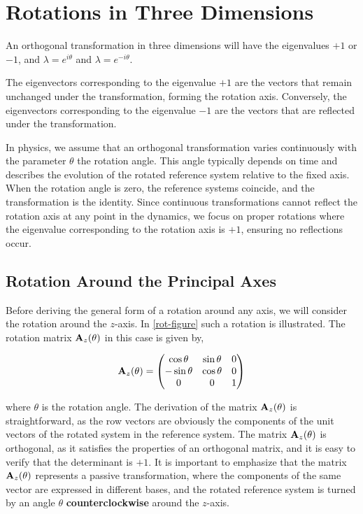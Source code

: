 \documentclass[12pt]{article}
\begin{document}
\section{Rotations in Three Dimensions}

An orthogonal transformation in three dimensions will have the eigenvalues $+1$ or $-1$, and
$\lambda = e^{i\theta}$ and $\lambda = e^{-i\theta}$.

The eigenvectors corresponding to the eigenvalue $+1$ are the vectors that remain unchanged
under the transformation, forming the rotation axis. Conversely, the eigenvectors
corresponding to the eigenvalue $-1$ are the vectors that are reflected under the
transformation.

In physics, we assume that an orthogonal transformation varies continuously with the
parameter $\theta$ the rotation angle. This angle typically depends on time and describes the
evolution of the rotated reference system relative to the fixed axis. When the rotation angle
is zero, the reference systems coincide, and the transformation is the identity. Since
continuous transformations cannot reflect the rotation axis at any point in the dynamics, we
focus on proper rotations where the eigenvalue corresponding to the rotation axis is $+1$,
ensuring no reflections occur.

\subsection{Rotation Around the Principal Axes}

Before deriving the general form of a rotation around any axis, we will consider the rotation
around the $z$-axis. In \eqref{rot-figure} such a rotation is illustrated.
 The rotation matrix $\vb{A}_z(\theta)$ in this case is given by,

\begin{equation}
  \vb{A}_z(\theta) =
  \begin{pmatrix}
    \cos\theta  & \sin\theta & 0 \\
    -\sin\theta & \cos\theta & 0 \\
    0           & 0          & 1
  \end{pmatrix}
\end{equation}

where $\theta$ is the rotation angle. The derivation of the matrix $\vb{A}_z(\theta)$ is
straightforward, as the row vectors are obviously the components of the unit vectors of the
rotated system in the reference system. The matrix $\vb{A}_z(\theta)$ is orthogonal, as it
satisfies the properties of an orthogonal matrix, and it is easy to verify that the
determinant is $+1$. It is important to emphasize that the matrix $\vb{A}_z(\theta)$
represents a passive transformation, where the components of the same vector are expressed
in different bases, and the rotated reference system is turned by an angle $\theta$
\textbf{counterclockwise} around the $z$-axis.
\end{document}
